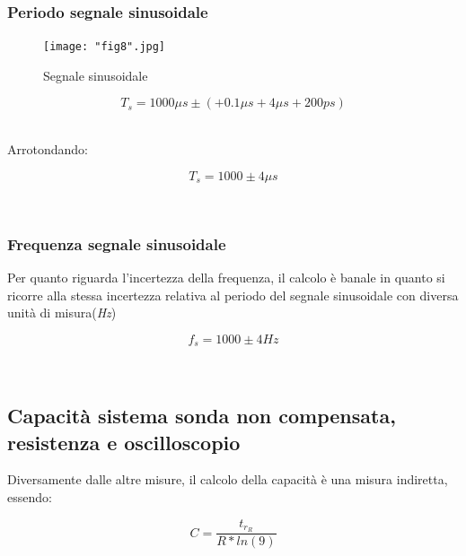 \documentclass[a4paper]{article}
\begin{document}
\subsubsection{Periodo segnale sinusoidale}
\begin{figure}[htp]
	\centering
	\texttt{[image: "fig8".jpg]}
	\caption{Segnale sinusoidale }
	\label{}
\end{figure}
\begin{Large}
	\begin{equation}
  		{T_s}= 1000\mu s\pm (+ 0.1 \mu s + 4 \mu s + 200ps)
	\end{equation}
\end{Large}\\
Arrotondando: 

\begin{Large}
	\begin{equation}
		{T_s}= 1000 \pm 4\mu s 
	\end{equation}
\end{Large}\\


\subsubsection{Frequenza segnale sinusoidale}
%
Per quanto riguarda l'incertezza della frequenza, il calcolo è banale in quanto si ricorre alla stessa incertezza relativa al periodo del segnale sinusoidale con diversa unità di misura(\emph{Hz})
\begin{Large}
	\begin{equation}
  		{f_s}= 1000\pm 4Hz
	\end{equation}
\end{Large}\\

\subsection{Capacità sistema sonda non compensata, resistenza e oscilloscopio}
Diversamente dalle altre misure, il calcolo della capacità è una misura indiretta, essendo: 
\begin{Large}
	\begin{equation}
  		C= \frac{t_{r_R}}{R*ln(9)}
	\end{equation}
\end{Large}\\
\end{document}
